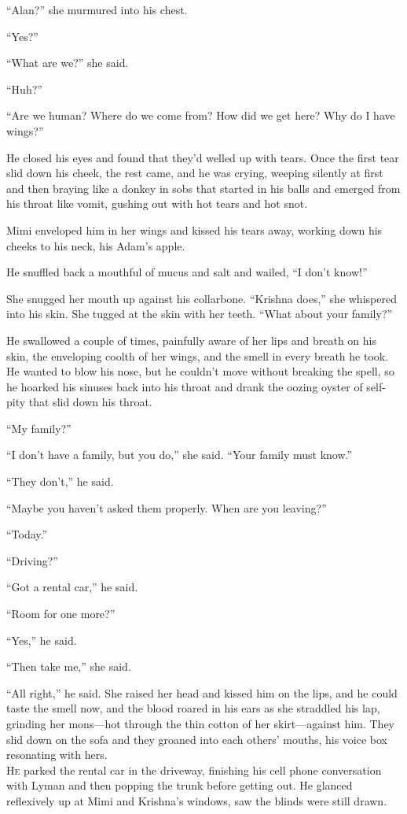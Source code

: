 \documentclass{article}
\begin{document}
``Alan?'' she murmured into his chest.

``Yes?''

``What are we?'' she said.

``Huh?''

``Are we human?  Where do we come from?  How did we get here?  Why do
I have wings?''

He closed his eyes and found that they'd welled up with tears.  Once
the first tear slid down his cheek, the rest came, and he was crying,
weeping silently at first and then braying like a donkey in sobs that
started in his balls and emerged from his throat like vomit, gushing
out with hot tears and hot snot.

Mimi enveloped him in her wings and kissed his tears away, working
down his cheeks to his neck, his Adam's apple.

He snuffled back a mouthful of mucus and salt and wailed, ``I don't
know!''

She snugged her mouth up against his collarbone.  ``Krishna does,''
she whispered into his skin.  She tugged at the skin with her teeth. 
``What about your family?''

He swallowed a couple of times, painfully aware of her lips and breath
on his skin, the enveloping coolth of her wings, and the smell in
every breath he took.  He wanted to blow his nose, but he couldn't
move without breaking the spell, so he hoarked his sinuses back into
his throat and drank the oozing oyster of self-pity that slid down his
throat.

``My family?''

``I don't have a family, but you do,'' she said.  ``Your family must
know.''

``They don't,'' he said.

``Maybe you haven't asked them properly.  When are you leaving?''

``Today.''

``Driving?''

``Got a rental car,'' he said.

``Room for one more?''

``Yes,'' he said.

``Then take me,'' she said.

``All right,'' he said.  She raised her head and kissed him on the
lips, and he could taste the smell now, and the blood roared in his
ears as she straddled his lap, grinding her mons---hot through the
thin cotton of her skirt---against him.  They slid down on the sofa
and they groaned into each others' mouths, his voice box resonating
with hers.
\\
\lettrine[lines=3, lhang=.5, nindent=0pt, findent=2pt]{H}{e} parked the rental car in the driveway, finishing his cell phone
conversation with Lyman and then popping the trunk before getting out. 
He glanced reflexively up at Mimi and Krishna's windows, saw the
blinds were still drawn.
\end{document}

